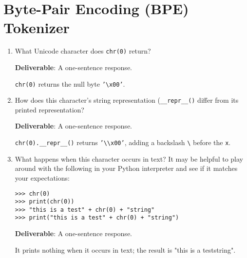\section{Byte-Pair Encoding (BPE) Tokenizer}


\begin{enumerate}[label=(\alph*)]
    \item {What Unicode character does \texttt{chr(0)} return?}
    
    {\textbf{Deliverable}: A one-sentence response.}
    
    \begin{answer}
    \texttt{chr(0)} returns the null byte \texttt{'\textbackslash x00'}.
    \end{answer}
    
    \item {How does this character's string representation (\texttt{\_\_repr\_\_()} differ from its printed representation?}
    
    {\textbf{Deliverable}: A one-sentence response.}
    
    \begin{answer}
    \texttt{chr(0).\_\_repr\_\_()} returns \texttt{'\textbackslash\textbackslash x00'}, adding a backslash \texttt{\textbackslash} before the \texttt{x}.
    \end{answer}
    
    \item {What happens when this character occurs in text? It may be helpful to play around with the following in your Python interpreter and see if it matches your expectations:}
    
    \begin{lstlisting}
>>> chr(0)
>>> print(chr(0))
>>> "this is a test" + chr(0) + "string"
>>> print("this is a test" + chr(0) + "string")
    \end{lstlisting}
    
    {\textbf{Deliverable}: A one-sentence response.}
    
    \begin{answer}
    It prints nothing when it occurs in text; the result is "this is a teststring".
    \end{answer}
\end{enumerate}


